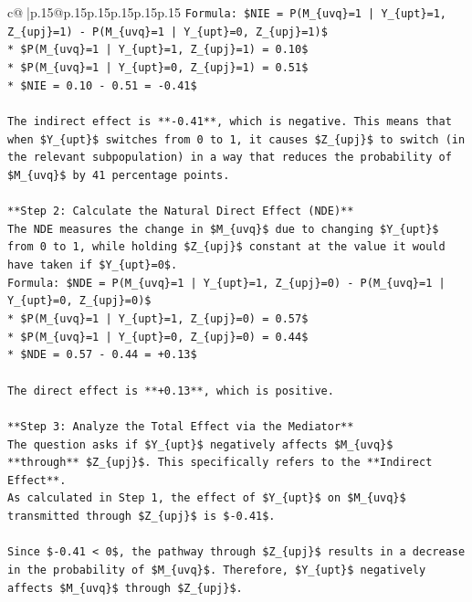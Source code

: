 \documentclass{article}
\begin{document}
{\begin{supertabular}{c@{$\;$}|p{.15\linewidth}@{}p{.15\linewidth}p{.15\linewidth}p{.15\linewidth}p{.15\linewidth}p{.15\linewidth}}
{{{\texttt{Formula: \$NIE = P(M\_\{uvq\}=1 | Y\_\{upt\}=1, Z\_\{upj\}=1) {-} P(M\_\{uvq\}=1 | Y\_\{upt\}=0, Z\_\{upj\}=1)\$} \\
\texttt{*   \$P(M\_\{uvq\}=1 | Y\_\{upt\}=1, Z\_\{upj\}=1) = 0.10\$} \\
\texttt{*   \$P(M\_\{uvq\}=1 | Y\_\{upt\}=0, Z\_\{upj\}=1) = 0.51\$} \\
\texttt{*   \$NIE = 0.10 {-} 0.51 = {-}0.41\$} \\
\\ 
\texttt{The indirect effect is **{-}0.41**, which is negative. This means that when \$Y\_\{upt\}\$ switches from 0 to 1, it causes \$Z\_\{upj\}\$ to switch (in the relevant subpopulation) in a way that reduces the probability of \$M\_\{uvq\}\$ by 41 percentage points.} \\
\\ 
\texttt{**Step 2: Calculate the Natural Direct Effect (NDE)**} \\
\texttt{The NDE measures the change in \$M\_\{uvq\}\$ due to changing \$Y\_\{upt\}\$ from 0 to 1, while holding \$Z\_\{upj\}\$ constant at the value it would have taken if \$Y\_\{upt\}=0\$.} \\
\texttt{Formula: \$NDE = P(M\_\{uvq\}=1 | Y\_\{upt\}=1, Z\_\{upj\}=0) {-} P(M\_\{uvq\}=1 | Y\_\{upt\}=0, Z\_\{upj\}=0)\$} \\
\texttt{*   \$P(M\_\{uvq\}=1 | Y\_\{upt\}=1, Z\_\{upj\}=0) = 0.57\$} \\
\texttt{*   \$P(M\_\{uvq\}=1 | Y\_\{upt\}=0, Z\_\{upj\}=0) = 0.44\$} \\
\texttt{*   \$NDE = 0.57 {-} 0.44 = +0.13\$} \\
\\ 
\texttt{The direct effect is **+0.13**, which is positive.} \\
\\ 
\texttt{**Step 3: Analyze the Total Effect via the Mediator**} \\
\texttt{The question asks if \$Y\_\{upt\}\$ negatively affects \$M\_\{uvq\}\$ **through** \$Z\_\{upj\}\$. This specifically refers to the **Indirect Effect**.} \\
\texttt{As calculated in Step 1, the effect of \$Y\_\{upt\}\$ on \$M\_\{uvq\}\$ transmitted through \$Z\_\{upj\}\$ is \${-}0.41\$.} \\
\\ 
\texttt{Since \${-}0.41 < 0\$, the pathway through \$Z\_\{upj\}\$ results in a decrease in the probability of \$M\_\{uvq\}\$. Therefore, \$Y\_\{upt\}\$ negatively affects \$M\_\{uvq\}\$ through \$Z\_\{upj\}\$.} \\
}}}
\end{supertabular}}
\end{document}
